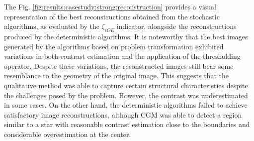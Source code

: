 			The Fig. \ref{fig:results:casestudy:strong:reconstruction} provides a visual representation of the best reconstructions obtained from the stochastic algorithms, as evaluated by the $\zeta_{\epsilon OE}$ indicator, alongside the reconstructions produced by the deterministic algorithms. It is noteworthy that the best images generated by the algorithms based on problem transformation exhibited variations in both contrast estimation and the application of the thresholding operator. Despite these variations, the reconstructed images still bear some resemblance to the geometry of the original image. This suggests that the qualitative method was able to capture certain structural characteristics despite the challenges posed by the problem. However, the contrast was underestimated in some cases. On the other hand, the deterministic algorithms failed to achieve satisfactory image reconstructions, although CGM was able to detect a region similar to a star with reasonable contrast estimation close to the boundaries and considerable overestimation at the center. 
		
